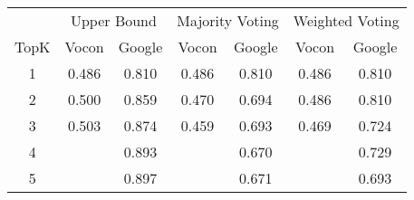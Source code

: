 \begin{tabular}{c|c|c|c|c|c|c}
&\multicolumn{2}{c|}{Upper Bound}&\multicolumn{2}{c|}{Majority Voting}&\multicolumn{2}{c}{Weighted Voting}\\
TopK&Vocon&Google&Vocon&Google&Vocon&Google\\\hline
1&0.486&0.810&0.486&0.810&0.486&0.810\\
2&0.500&0.859&0.470&0.694&0.486&0.810\\
3&0.503&0.874&0.459&0.693&0.469&0.724\\
4&&0.893&&0.670&&0.729\\
5&&0.897&&0.671&&0.693\\
\end{tabular}
